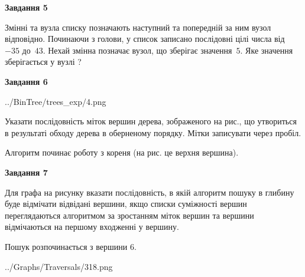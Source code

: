 \documentclass[12pt, ukrainian]{article}
\begin{document}
{\begin {large}
{\begin {center}\textbf{Завдання 5}\end {center}}\par
Змінні  та  вузла списку позначають наступний та попередній за ним вузол відповідно. Починаючи з голови, у список записано послідовні цілі числа від~$-35$ до~$43$. Нехай змінна  позначає вузол, що зберігає значення~$5$.
Яке значення зберігається у вузлі  ?\par
\newpage

{\begin {center}\textbf{Завдання 6}\end {center}}\par

\begin{center}
	{../BinTree/trees_exp/4.png}
\end{center}
Указати послідовність міток вершин дерева, зображеного на рис., що утвориться в результаті обходу дерева в оберненому порядку. Мітки записувати через пробіл.\par Алгоритм починає роботу з кореня (на рис. це верхня вершина).\par
\newpage

{\begin {center}\textbf{Завдання 7}\end {center}}\par
Для графа на рисунку вказати послідовність, в якій алгоритм пошуку в глибину буде відмічати відвідані вершини, якщо списки суміжності вершин переглядаються алгоритмом за зростанням міток вершин та вершини відмічаються на першому вход\-женні у вершину.\par
Пошук розпочинається з вершини 6.\par

\begin{center}
	{../Graphs/Traversals/318.png}
\end{center}\par
\newpage


\end{large}}
\end{document}
